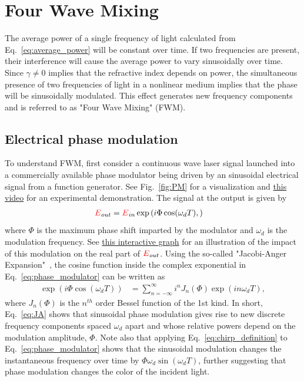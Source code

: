 \chapter{Four Wave Mixing}
\label{ch:FWM}

The average power of a single frequency of light calculated from Eq.~\ref{eq:average_power} will be constant over time. If two frequencies are present, their interference will cause the average power to vary sinusoidally over time. Since $\gamma\neq0$ implies that the refractive index depends on power, the simultaneous presence of two frequencies of light in a nonlinear medium implies that the phase will be sinusoidally modulated. This effect generates new frequency components and is referred to as "Four Wave Mixing" (FWM).




\section{Electrical phase modulation}
To understand FWM, first consider a continuous wave laser signal launched into a commercially available phase modulator being driven by an sinusoidal electrical signal from a function generator. See Fig.~\ref{fig:PM} for a visualization and \href{https://youtu.be/j8It3to54AQ}{this video} for an experimental demonstration. The signal at the output is given by
\begin{align}
    \label{eq:phase_modulator}
    \textcolor{red}{E}_{out}&=\textcolor{red}{E}_{in}\exp\left(i\Phi\cos(\omega_dT), \right)
\end{align}
where $\Phi$ is the maximum phase shift imparted by the modulator and $\omega_d$ is the modulation frequency. See \href{https://www.desmos.com/calculator/vcreo1gs2q}{this interactive graph} for an illustration of the impact of this modulation on the real part of $\textcolor{red}{E}_{out}$. Using the so-called "Jacobi-Anger Expansion"~\cite{NIST_JA_expansion}, the cosine function inside the complex exponential in Eq.~\ref{eq:phase_modulator} can be written as
\begin{align}
\label{eq:JA}
    \exp\left(i\Phi\cos(\omega_dT)\right) &= \sum_{n=-\infty}^{\infty}i^n J_n(\Phi) \exp\left(in\omega_dT\right),
\end{align}
where $J_n(\Phi)$ is the $n^{th}$ order Bessel function of the 1st kind. In short, Eq.~\ref{eq:JA} shows that sinusoidal phase modulation gives rise to new discrete frequency components spaced $\omega_d$ apart and whose relative powers depend on the modulation amplitude, $\Phi$. Note also that applying Eq.~\ref{eq:chirp_definition} to Eq.~\ref{eq:phase_modulator} shows that the sinusoidal modulation changes the instantaneous frequency over time by $\Phi\omega_d\sin(\omega_dT)$, further suggesting that phase modulation changes the color of the incident light.

